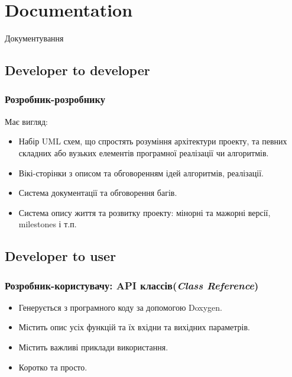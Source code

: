 \documentclass[final,12pt,aspectratio=43]{beamer}
\begin{document}
\section{Documentation}
\begin{frame}
    \begin{center}
        \huge \ttfamily Документування
    \end{center}
\end{frame}

\subsection{Developer to developer}
\begin{frame}
    \frametitle{Розробник-розробнику}
    Має вигляд:
    \begin{itemize}
        \item Набір UML схем, що спростять розуміння архітектури проекту, та певних складних або вузьких елементів програмної реалізації чи алгоритмів.
        \item Вікі-сторінки з описом та обговоренням ідей алгоритмів, реалізації.
        \item Система документації та обговорення багів.
        \item Система опису життя та розвитку проекту: мінорні та мажорні версії, milestones і т.п.
    \end{itemize}
\end{frame}

\subsection{Developer to user}
\begin{frame}
    \frametitle{Розробник-користувачу: API классів({\it Class Reference})}
    \begin{itemize}
        \item Генерується з програмного коду за допомогою Doxygen.
        \item Містить опис усіх функцій та їх вхідни та вихідних параметрів.
        \item Містить важливі приклади використання.
        \item Коротко та просто.
    \end{itemize}
\end{frame}
\end{document}
